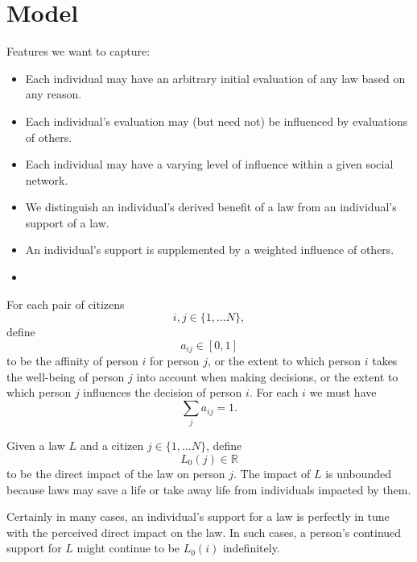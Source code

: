 
\section{Model}
\label{sec:model} 

Features we want to capture:

\begin{itemize}
\item Each individual may have an arbitrary initial evaluation of any law based on any reason.
\item Each individual's evaluation may (but need not) be influenced by evaluations of others.
\item Each individual may have a varying level of influence within a given social network.
\item We distinguish an individual's derived benefit of a law from an individual's support of a law. 
\item An individual's support is supplemented by a weighted influence of others. %
\item 
\end{itemize}

For each pair of citizens $$i,j\in\{1,\dots N\},$$ define $$a_{ij}\in [0,1]$$ to be the affinity of person $i$ for person $j$, or the extent to which person $i$ takes the well-being of person $j$ into account when making decisions, or the extent to which person $j$ influences the decision of person $i$. For each $i$ we must have $$\sum_ja_{ij}=1.$$%

Given a law $L$ and a citizen $j\in\{1,\dots N\}$, %
define $$L_0(j)\in\mathbb{R}$$ to be the direct impact of the law on person $j$. The impact of $L$ is unbounded because laws may save a life or take away life from individuals impacted by them.

Certainly in many cases, an individual's support for a law is perfectly in tune with the perceived direct impact on the law.  In such cases, a person's continued support for $L$ might continue to be $L_0(i)$ indefinitely. %

